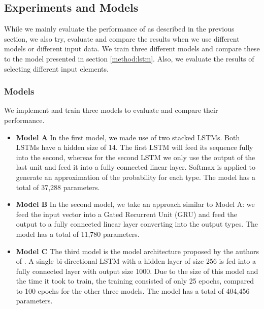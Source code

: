 \subsection{Experiments and Models} \label{evaluation:experiments}
While we mainly evaluate the performance of \dltpy{} as described in the previous section, we also try, evaluate and compare the results when we use different models or different input data. We train three different models and compare these to the model presented in section \ref{method:lstm}. Also, we evaluate the results of selecting different input elements.



\subsubsection{Models} \label{evaluation:experiments:models}
We implement and train three models to evaluate and compare their performance.
\begin{notsw}
\begin{itemize}
    
    \item \textbf{Model A} In the first model, we made use of two stacked LSTMs. Both LSTMs have a hidden size of 14. The first LSTM will feed its sequence fully into the second, whereas for the second LSTM we only use the output of the last unit and feed it into a fully connected linear layer. Softmax is applied to generate an approximation of the probability for each type. The model has a total of 37,288 parameters.
    
    \item \textbf{Model B} In the second model, we take an approach similar to Model A: we feed the input vector into a Gated Recurrent Unit (GRU) \cite{Cho2014LearningTranslation} and feed the output to a fully connected linear layer converting into the output types. The model has a total of 11,780 parameters.
    
    \item \textbf{Model C} The third model is the model architecture proposed by the authors of \cite{Malik2019NL2Type:Information}. A single bi-directional LSTM with a hidden layer of size 256 is fed into a fully connected layer with output size 1000. Due to the size of this model and the time it took to train, the training consisted of only 25 epochs, compared to 100 epochs for the other three models. The model has a total of 404,456 parameters.
\end{itemize}
\end{notsw}

